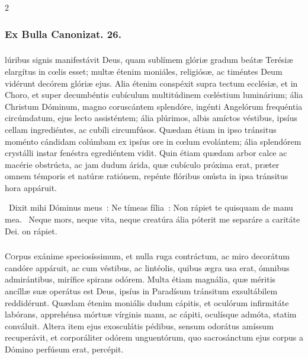 \documentclass[9pt,twoside]{extarticle}
\begin{document}
\begin{multicols}{2}
\subsubsection*{\center Ex Bulla Canonizat. 26.}
\subsubsection*{\center {}}
lúribus signis manifestávit Deus, quam sublímem glóriæ gradum beátæ Terésiæ elargítus in cœlis esset; multæ étenim moniáles, religiósæ, ac timéntes Deum vidérunt decórem glóriæ ejus. Alia étenim conspéxit supra tectum ecclésiæ, et in Choro, et super decumbéntis cubículum multitúdinem cœléstium luminárium; ália Christum Dóminum, magno coruscántem splendóre, ingénti Angelórum frequéntia circúmdatum, ejus lecto assisténtem; ália plúrimos, albis amíctos véstibus, ipsíus cellam ingrediéntes, ac cubíli circumfúsos. Quædam étiam in ipso tránsitus moménto cándidam colúmbam ex ipsíus ore in cœlum evolántem; ália splendórem crystálli instar fenéstra egrediéntem vidit. Quin étiam quædam arbor calce ac macérie obstrúcta, ac jam dudum árida, quæ cubículo próxima erat, præter omnem témporis et natúræ ratiónem, repénte flóribus onústa in ipsa tránsitus hora appáruit.

\begin{tightlist}{}
\item {}~Dixit mihi Dóminus meus~: Ne tímeas fília~: \textred{*} Non rápiet te quisquam de manu mea. ~Neque mors, neque vita, neque creatúra ália póterit me separáre a caritáte Dei. on rápiet.
\end{tightlist}

\subsubsection*{\center {}}
\lettrine{C}orpus exánime speciosíssimum, et nulla ruga contráctum, ac miro decorátum candóre appáruit, ac cum véstibus, ac lintéolis, quibus ægra usa erat, ómnibus admirántibus, mirífice spirans odórem. Multa étiam magnália, quæ méritis ancíllæ suæ operátus est Deus, ipsíus in Paradísum tránsitum exsultábilem reddidérunt. Quædam étenim moniális dudum cápitis, et oculórum infirmitáte labórans, apprehénsa mórtuæ vírginis manu, ac cápiti, oculísque admóta, statim conváluit. Altera item ejus exosculátis pédibus, sensum odorátus amíssum recuperávit, et corporáliter odórem unguentórum, quo sacrosánctum ejus corpus a Dómino perfúsum erat, percépit.


\end{multicols}
\end{document}
